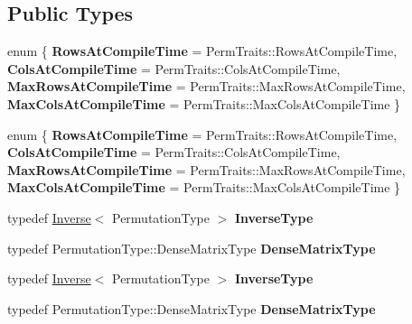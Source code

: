 \subsection*{Public Types}
\begin{DoxyCompactItemize}
\item 
\mbox{\label{class_eigen_1_1_inverse_impl_3_01_permutation_type_00_01_permutation_storage_01_4_a0784cfb7d978289ad319310dfb20c7c5}} 
enum \{ {\bfseries Rows\+At\+Compile\+Time} = Perm\+Traits\+:\+:Rows\+At\+Compile\+Time, 
{\bfseries Cols\+At\+Compile\+Time} = Perm\+Traits\+:\+:Cols\+At\+Compile\+Time, 
{\bfseries Max\+Rows\+At\+Compile\+Time} = Perm\+Traits\+:\+:Max\+Rows\+At\+Compile\+Time, 
{\bfseries Max\+Cols\+At\+Compile\+Time} = Perm\+Traits\+:\+:Max\+Cols\+At\+Compile\+Time
 \}
\item 
\mbox{\label{class_eigen_1_1_inverse_impl_3_01_permutation_type_00_01_permutation_storage_01_4_a7aa3e60c829b49bed07d795588382a8f}} 
enum \{ {\bfseries Rows\+At\+Compile\+Time} = Perm\+Traits\+:\+:Rows\+At\+Compile\+Time, 
{\bfseries Cols\+At\+Compile\+Time} = Perm\+Traits\+:\+:Cols\+At\+Compile\+Time, 
{\bfseries Max\+Rows\+At\+Compile\+Time} = Perm\+Traits\+:\+:Max\+Rows\+At\+Compile\+Time, 
{\bfseries Max\+Cols\+At\+Compile\+Time} = Perm\+Traits\+:\+:Max\+Cols\+At\+Compile\+Time
 \}
\item 
\mbox{\label{class_eigen_1_1_inverse_impl_3_01_permutation_type_00_01_permutation_storage_01_4_a9c2e8fec08e169e88e01c37cbc1ea69f}} 
typedef \hyperlink{class_eigen_1_1_inverse}{Inverse}$<$ Permutation\+Type $>$ {\bfseries Inverse\+Type}
\item 
\mbox{\label{class_eigen_1_1_inverse_impl_3_01_permutation_type_00_01_permutation_storage_01_4_a8596960618ffe5e72f897d0a53b35b21}} 
typedef Permutation\+Type\+::\+Dense\+Matrix\+Type {\bfseries Dense\+Matrix\+Type}
\item 
\mbox{\label{class_eigen_1_1_inverse_impl_3_01_permutation_type_00_01_permutation_storage_01_4_a9c2e8fec08e169e88e01c37cbc1ea69f}} 
typedef \hyperlink{class_eigen_1_1_inverse}{Inverse}$<$ Permutation\+Type $>$ {\bfseries Inverse\+Type}
\item 
\mbox{\label{class_eigen_1_1_inverse_impl_3_01_permutation_type_00_01_permutation_storage_01_4_a8596960618ffe5e72f897d0a53b35b21}} 
typedef Permutation\+Type\+::\+Dense\+Matrix\+Type {\bfseries Dense\+Matrix\+Type}
\end{DoxyCompactItemize}
